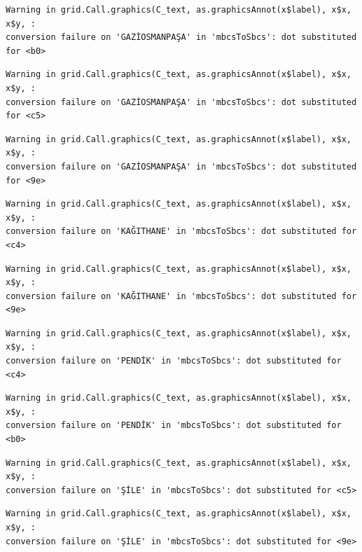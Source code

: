 \documentclass[
  11pt,
  a4paper,
  DIV=11,
  numbers=noendperiod]{scrartcl}
\begin{document}
\begin{verbatim}
Warning in grid.Call.graphics(C_text, as.graphicsAnnot(x$label), x$x, x$y, :
conversion failure on 'GAZİOSMANPAŞA' in 'mbcsToSbcs': dot substituted for <b0>
\end{verbatim}

\begin{verbatim}
Warning in grid.Call.graphics(C_text, as.graphicsAnnot(x$label), x$x, x$y, :
conversion failure on 'GAZİOSMANPAŞA' in 'mbcsToSbcs': dot substituted for <c5>
\end{verbatim}

\begin{verbatim}
Warning in grid.Call.graphics(C_text, as.graphicsAnnot(x$label), x$x, x$y, :
conversion failure on 'GAZİOSMANPAŞA' in 'mbcsToSbcs': dot substituted for <9e>
\end{verbatim}

\begin{verbatim}
Warning in grid.Call.graphics(C_text, as.graphicsAnnot(x$label), x$x, x$y, :
conversion failure on 'KAĞITHANE' in 'mbcsToSbcs': dot substituted for <c4>
\end{verbatim}

\begin{verbatim}
Warning in grid.Call.graphics(C_text, as.graphicsAnnot(x$label), x$x, x$y, :
conversion failure on 'KAĞITHANE' in 'mbcsToSbcs': dot substituted for <9e>
\end{verbatim}

\begin{verbatim}
Warning in grid.Call.graphics(C_text, as.graphicsAnnot(x$label), x$x, x$y, :
conversion failure on 'PENDİK' in 'mbcsToSbcs': dot substituted for <c4>
\end{verbatim}

\begin{verbatim}
Warning in grid.Call.graphics(C_text, as.graphicsAnnot(x$label), x$x, x$y, :
conversion failure on 'PENDİK' in 'mbcsToSbcs': dot substituted for <b0>
\end{verbatim}

\begin{verbatim}
Warning in grid.Call.graphics(C_text, as.graphicsAnnot(x$label), x$x, x$y, :
conversion failure on 'ŞİLE' in 'mbcsToSbcs': dot substituted for <c5>
\end{verbatim}

\begin{verbatim}
Warning in grid.Call.graphics(C_text, as.graphicsAnnot(x$label), x$x, x$y, :
conversion failure on 'ŞİLE' in 'mbcsToSbcs': dot substituted for <9e>
\end{verbatim}
\end{document}
